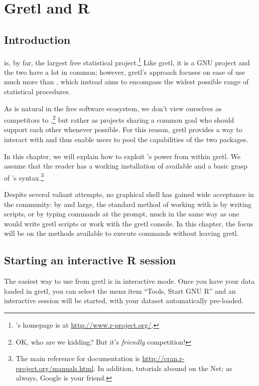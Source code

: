 \chapter{Gretl and R}
\label{chap:gretlR}

\section{Introduction}
\label{R-intro}

 is, by far, the largest free statistical
project.\footnote{'s homepage is at
  \url{http://www.r-project.org/}.} Like gretl, it is a GNU project
and the two have a lot in common; however, gretl's approach focuses on
ease of use much more than , which instead aims to encompass
the widest possible range of statistical procedures.

As is natural in the free software ecosystem, we don't view ourselves
as competitors to ,\footnote{OK, who are we kidding? But it's
  \emph{friendly} competition!} but rather as projects sharing a
common goal who should support each other whenever possible. For this
reason, gretl provides a way to interact with  and thus enable
users to pool the capabilities of the two packages.

In this chapter, we will explain how to exploit 's power from
within gretl. We assume that the reader has a working installation of
 available and a basic grasp of 's syntax.\footnote{The
  main reference for  documentation is
  \url{http://cran.r-project.org/manuals.html}.  In addition, 
  tutorials abound on the Net; as always, Google is your friend.}

Despite several valiant attempts, no graphical shell has gained wide
acceptance in the  community: by and large, the standard method
of working with  is by writing scripts, or by typing commands
at the  prompt, much in the same way as one would write
gretl scripts or work with the gretl console. In this
chapter, the focus will be on the methods available to execute 
commands without leaving gretl.

\section{Starting an interactive R session}
\label{sec:R-interactive}

The easiest way to use  from gretl is in interactive
mode.  Once you have your data loaded in gretl, you can select
the menu item ``Tools, Start GNU R'' and an interactive 
session will be started, with your dataset automatically pre-loaded.

